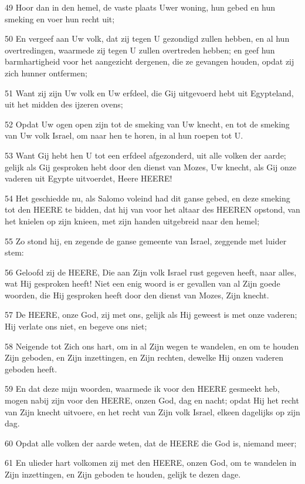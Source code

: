 \par 49 Hoor dan in den hemel, de vaste plaats Uwer woning, hun gebed en hun smeking en voer hun recht uit;
\par 50 En vergeef aan Uw volk, dat zij tegen U gezondigd zullen hebben, en al hun overtredingen, waarmede zij tegen U zullen overtreden hebben; en geef hun barmhartigheid voor het aangezicht dergenen, die ze gevangen houden, opdat zij zich hunner ontfermen;
\par 51 Want zij zijn Uw volk en Uw erfdeel, die Gij uitgevoerd hebt uit Egypteland, uit het midden des ijzeren ovens;
\par 52 Opdat Uw ogen open zijn tot de smeking van Uw knecht, en tot de smeking van Uw volk Israel, om naar hen te horen, in al hun roepen tot U.
\par 53 Want Gij hebt hen U tot een erfdeel afgezonderd, uit alle volken der aarde; gelijk als Gij gesproken hebt door den dienst van Mozes, Uw knecht, als Gij onze vaderen uit Egypte uitvoerdet, Heere HEERE!
\par 54 Het geschiedde nu, als Salomo voleind had dit ganse gebed, en deze smeking tot den HEERE te bidden, dat hij van voor het altaar des HEEREN opstond, van het knielen op zijn knieen, met zijn handen uitgebreid naar den hemel;
\par 55 Zo stond hij, en zegende de ganse gemeente van Israel, zeggende met luider stem:
\par 56 Geloofd zij de HEERE, Die aan Zijn volk Israel rust gegeven heeft, naar alles, wat Hij gesproken heeft! Niet een enig woord is er gevallen van al Zijn goede woorden, die Hij gesproken heeft door den dienst van Mozes, Zijn knecht.
\par 57 De HEERE, onze God, zij met ons, gelijk als Hij geweest is met onze vaderen; Hij verlate ons niet, en begeve ons niet;
\par 58 Neigende tot Zich ons hart, om in al Zijn wegen te wandelen, en om te houden Zijn geboden, en Zijn inzettingen, en Zijn rechten, dewelke Hij onzen vaderen geboden heeft.
\par 59 En dat deze mijn woorden, waarmede ik voor den HEERE gesmeekt heb, mogen nabij zijn voor den HEERE, onzen God, dag en nacht; opdat Hij het recht van Zijn knecht uitvoere, en het recht van Zijn volk Israel, elkeen dagelijks op zijn dag.
\par 60 Opdat alle volken der aarde weten, dat de HEERE die God is, niemand meer;
\par 61 En ulieder hart volkomen zij met den HEERE, onzen God, om te wandelen in Zijn inzettingen, en Zijn geboden te houden, gelijk te dezen dage.
